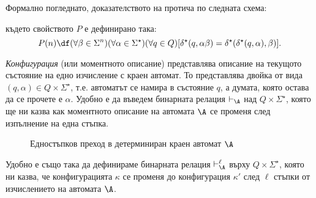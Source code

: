 \begin{remark}
Формално погледнато, доказателството на  протича по следната схема:
  \begin{prooftree}
  \end{prooftree}
  където свойството $P$ е дефинирано така:
  \[P(n) \df (\forall \beta\in\Sigma^n)(\forall \alpha\in\Sigma^\star)(\forall q\in Q)[\delta^\star(q,\alpha\beta) = \delta^\star(\delta^\star(q,\alpha),\beta)].\]
\end{remark}


\emph{Конфигурация} (или моментното описание) представлява описание на текущото състояние на едно изчисление с краен автомат. То представлява двойка от вида $(q,\alpha) \in Q\times\Sigma^\star$,
т.е. автоматът се намира в състояние $q$, а думата, която остава да се прочете е $\alpha$.
Удобно е да въведем бинарната релация $\vdash_\A$ над $Q\times\Sigma^\star$,
която ще ни казва как моментното описание на автомата $\A$ се променя след изпълнение на една стъпка.
\begin{important}
  \begin{figure}[H]
    \begin{prooftree}
    \end{prooftree}
    \caption{Едностъпков преход в детерминиран краен автомат $\A$}
  \end{figure}
\end{important}

Удобно е също така да дефинираме бинарната релация $\vdash^\ell_\A$ върху $Q\times\Sigma^\star$, която ни казва, че
конфигурацията $\kappa$ се променя до конфигурация $\kappa'$ след $\ell$ стъпки от изчислението на автомата $\A$.

